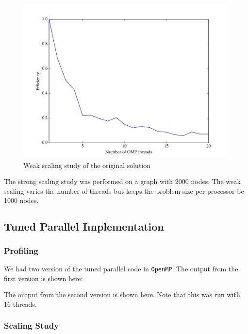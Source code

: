 \documentclass[11pt]{article}
\begin{document}
\begin{figure}[H]
\centering
\includegraphics[scale=0.5]{./scaling_studies/weak_scaling_original.png}
\caption{Weak scaling study of the original solution}
\label{fig:ws_orig}
\end{figure}

The strong scaling study was performed on a graph with 2000 nodes. The weak scaling varies the number of threads but keeps the problem size per processor be 1000 nodes. 

\newpage
\subsection{Tuned Parallel Implementation}

\subsubsection{Profiling} \label{sec:prof}

We had two version of the tuned parallel code in \texttt{OpenMP}. The output from the first version is shown here:



The output from the second version is shown here. Note that this was run with 16 threads.


\subsubsection{Scaling Study} \label{sec:speedup}
\end{document}
